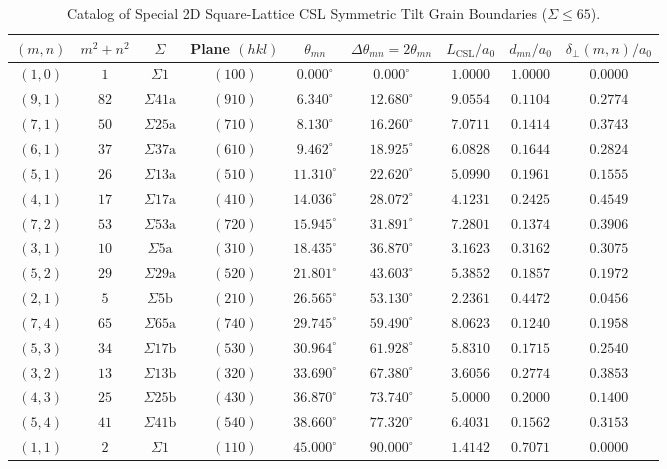\documentclass[11pt,a4paper]{article}
\begin{document}
\begin{table}[htbp]
\centering
\caption{Catalog of Special 2D Square-Lattice CSL Symmetric Tilt Grain Boundaries ($\Sigma \le 65$).}
\label{tab:csl_catalog}
\small
\begin{tabular}{ccccccccc}
\toprule
$(m,n)$ & $m^2+n^2$ & $\Sigma$ & Plane $(hkl)$ & $\theta_{mn}$ & $\Delta\theta_{mn} = 2\theta_{mn}$ & $L_{\text{CSL}}/a_0$ & $d_{mn}/a_0$ & $\delta_\perp(m,n)/a_0$ \\
\midrule
$(1,0)$ & $1$  & $\Sigma 1$   & $(100)$ & $0.000^\circ$  & $0.000^\circ$  & $1.0000$ & $1.0000$ & $0.0000$ \\
$(9,1)$ & $82$ & $\Sigma 41\text{a}$ & $(910)$ & $6.340^\circ$  & $12.680^\circ$ & $9.0554$ & $0.1104$ & $0.2774$ \\
$(7,1)$ & $50$ & $\Sigma 25\text{a}$ & $(710)$ & $8.130^\circ$  & $16.260^\circ$ & $7.0711$ & $0.1414$ & $0.3743$ \\
$(6,1)$ & $37$ & $\Sigma 37\text{a}$ & $(610)$ & $9.462^\circ$  & $18.925^\circ$ & $6.0828$ & $0.1644$ & $0.2824$ \\
$(5,1)$ & $26$ & $\Sigma 13\text{a}$ & $(510)$ & $11.310^\circ$ & $22.620^\circ$ & $5.0990$ & $0.1961$ & $0.1555$ \\
$(4,1)$ & $17$ & $\Sigma 17\text{a}$ & $(410)$ & $14.036^\circ$ & $28.072^\circ$ & $4.1231$ & $0.2425$ & $0.4549$ \\
$(7,2)$ & $53$ & $\Sigma 53\text{a}$ & $(720)$ & $15.945^\circ$ & $31.891^\circ$ & $7.2801$ & $0.1374$ & $0.3906$ \\
$(3,1)$ & $10$ & $\Sigma 5\text{a}$  & $(310)$ & $18.435^\circ$ & $36.870^\circ$ & $3.1623$ & $0.3162$ & $0.3075$ \\
$(5,2)$ & $29$ & $\Sigma 29\text{a}$ & $(520)$ & $21.801^\circ$ & $43.603^\circ$ & $5.3852$ & $0.1857$ & $0.1972$ \\
$(2,1)$ & $5$  & $\Sigma 5\text{b}$  & $(210)$ & $26.565^\circ$ & $53.130^\circ$ & $2.2361$ & $0.4472$ & $0.0456$ \\
$(7,4)$ & $65$ & $\Sigma 65\text{a}$ & $(740)$ & $29.745^\circ$ & $59.490^\circ$ & $8.0623$ & $0.1240$ & $0.1958$ \\
$(5,3)$ & $34$ & $\Sigma 17\text{b}$ & $(530)$ & $30.964^\circ$ & $61.928^\circ$ & $5.8310$ & $0.1715$ & $0.2540$ \\
$(3,2)$ & $13$ & $\Sigma 13\text{b}$ & $(320)$ & $33.690^\circ$ & $67.380^\circ$ & $3.6056$ & $0.2774$ & $0.3853$ \\
$(4,3)$ & $25$ & $\Sigma 25\text{b}$ & $(430)$ & $36.870^\circ$ & $73.740^\circ$ & $5.0000$ & $0.2000$ & $0.1400$ \\
$(5,4)$ & $41$ & $\Sigma 41\text{b}$ & $(540)$ & $38.660^\circ$ & $77.320^\circ$ & $6.4031$ & $0.1562$ & $0.3153$ \\
$(1,1)$ & $2$  & $\Sigma 1$   & $(110)$ & $45.000^\circ$ & $90.000^\circ$ & $1.4142$ & $0.7071$ & $0.0000$ \\
\bottomrule
\end{tabular}
\end{table}
\end{document}
